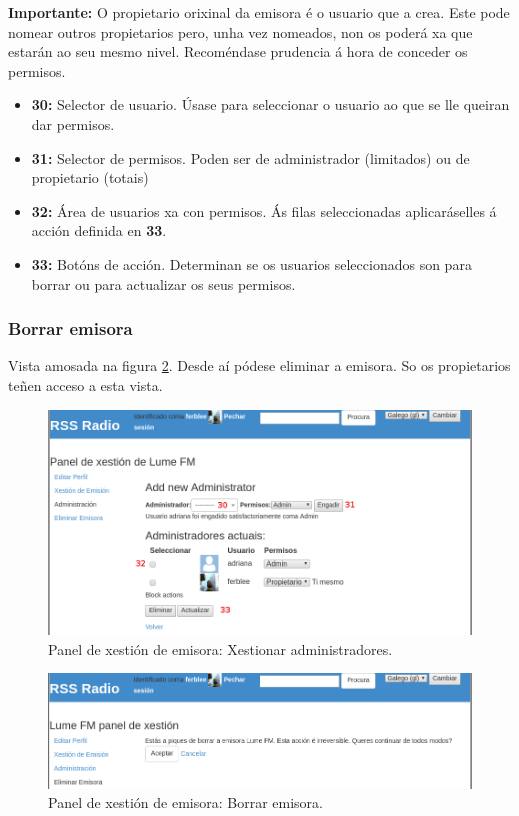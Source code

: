 \textbf{Importante:} O propietario orixinal da emisora é o usuario que a crea. Este pode nomear outros propietarios pero, unha vez nomeados, non os poderá  xa que estarán ao seu mesmo nivel. Recoméndase prudencia á hora de conceder os permisos.

\begin{itemize}
	\item \textbf{30:} Selector de usuario. Úsase para seleccionar o usuario ao que se lle queiran dar permisos.
	\item \textbf{31:} Selector de permisos. Poden ser de administrador (limitados) ou de propietario (totais)
	\item \textbf{32:} Área de usuarios xa con permisos. Ás filas seleccionadas aplicaráselles á acción definida en \textbf{33}.
	\item \textbf{33:} Botóns de acción. Determinan se os usuarios seleccionados son para borrar ou para actualizar os seus permisos.
\end{itemize}


\subsubsection{Borrar emisora}

Vista amosada na figura \ref{fig:um-edstation4}. Desde aí pódese eliminar a emisora. So os propietarios teñen acceso a esta vista.

\begin{figure}[H]
	\centering
	\includegraphics[scale=0.43,keepaspectratio=true]{./images/usermanual/um-edstation3.png}
	\caption{Panel de xestión de emisora: Xestionar administradores.}
	\label{fig:um-edstation3}
\end{figure}

\begin{figure}[H]
	\centering
	\includegraphics[scale=0.43,keepaspectratio=true]{./images/usermanual/um-edstation4.png}
	\caption{Panel de xestión de emisora: Borrar emisora.}
	\label{fig:um-edstation4}
\end{figure}


